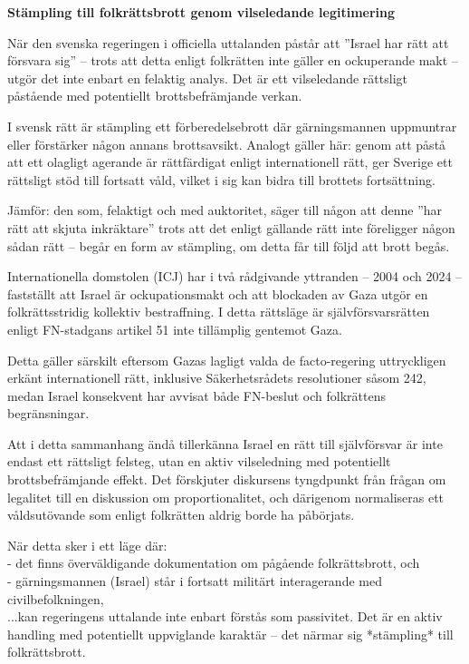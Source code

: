 \medskip
\textbf{Stämpling till folkrättsbrott genom vilseledande legitimering}

När den svenska regeringen i officiella uttalanden påstår att ”Israel har rätt att försvara sig” – trots att detta 
enligt folkrätten inte gäller en ockuperande makt – utgör det inte enbart en felaktig analys. 
Det är ett vilseledande rättsligt påstående med potentiellt brottsbefrämjande verkan.

I svensk rätt är stämpling ett förberedelsebrott där gärningsmannen uppmuntrar eller förstärker någon annans brottsavsikt. 
Analogt gäller här: genom att påstå att ett olagligt agerande är rättfärdigat enligt internationell rätt, 
ger Sverige ett rättsligt stöd till fortsatt våld, vilket i sig kan bidra till brottets fortsättning.

Jämför: den som, felaktigt och med auktoritet, säger till någon att denne ”har rätt att skjuta inkräktare” trots 
att det enligt gällande rätt inte föreligger någon sådan rätt – begår en form av stämpling, 
om detta får till följd att brott begås.

Internationella domstolen (ICJ) har i två rådgivande yttranden – 2004 och 2024 – fastställt att Israel är ockupationsmakt 
och att blockaden av Gaza utgör en folkrättsstridig kollektiv bestraffning. I detta rättsläge är 
självförsvarsrätten enligt FN-stadgans artikel 51 inte tillämplig gentemot Gaza. 

Detta gäller särskilt eftersom Gazas lagligt valda de facto-regering uttryckligen erkänt internationell rätt, inklusive 
Säkerhetsrådets resolutioner såsom 242, medan Israel konsekvent har avvisat både FN-beslut och folkrättens begränsningar.

Att i detta sammanhang ändå tillerkänna Israel en rätt till självförsvar är inte endast ett rättsligt felsteg, 
utan en aktiv vilseledning med potentiellt brottsbefrämjande effekt. Det förskjuter diskursens tyngdpunkt 
från frågan om legalitet till en diskussion om proportionalitet, och därigenom normaliseras ett våldsutövande 
som enligt folkrätten aldrig borde ha påbörjats.

När detta sker i ett läge där:\\
- det finns överväldigande dokumentation om pågående folkrättsbrott, och\\
- gärningsmannen (Israel) står i fortsatt militärt interagerande med civilbefolkningen,\\

...kan regeringens uttalande inte enbart förstås som passivitet. 
Det är en aktiv handling med potentiellt uppviglande karaktär – det närmar sig *stämpling* till folkrättsbrott.

